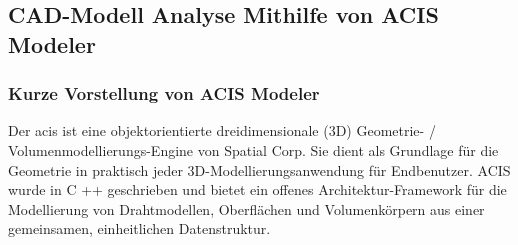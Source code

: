 \documentclass[14pt,a4paper,titlepage]{article}
\begin{document}
			
		\subsection{CAD-Modell Analyse Mithilfe von ACIS Modeler}
			\subsubsection{Kurze Vorstellung von ACIS Modeler}
			Der \ac{acis} ist eine objektorientierte dreidimensionale (3D) Geometrie- / Volumenmodellierungs-Engine von Spatial Corp. Sie dient als Grundlage für die Geometrie in praktisch jeder 3D-Modellierungsanwendung für Endbenutzer. ACIS wurde in C ++ geschrieben und bietet ein offenes Architektur-Framework für die Modellierung von Drahtmodellen, Oberflächen und Volumenkörpern aus einer gemeinsamen, einheitlichen Datenstruktur.
\end{document}
